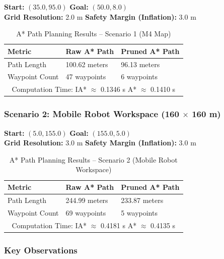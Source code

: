 \textbf{Start:} $(35.0, 95.0)$ \quad \textbf{Goal:} $(50.0, 8.0)$ \\
\textbf{Grid Resolution:} 2.0 m \quad \textbf{Safety Margin (Inflation):} 3.0 m

\begin{table}[H]
	\centering
	\caption{A* Path Planning Results -- Scenario 1 (M4 Map)}
	\label{tab:astar_results_scenario1}
	\begin{tabular}{|p{4.5cm}|p{4cm}|p{4cm}|}
		\hline
		\textbf{Metric} & \textbf{Raw A* Path} & \textbf{Pruned A* Path} \\
		\hline
		Path Length & 100.62 meters & 96.13 meters \\
		\hline
		Waypoint Count & 47 waypoints & 6 waypoints \\
		\hline
		\multicolumn{3}{|c|}{Computation Time: IA* $\approx$ 0.1346 s \quad A* $\approx$ 0.1410 s} \\
		\hline
	\end{tabular}
\end{table}

\subsubsection*{Scenario 2: Mobile Robot Workspace (160 $\times$ 160 m)}

\textbf{Start:} $(5.0, 155.0)$ \quad \textbf{Goal:} $(155.0, 5.0)$ \\
\textbf{Grid Resolution:} 3.0 m \quad \textbf{Safety Margin (Inflation):} 3.0 m

\begin{table}[H]
	\centering
	\caption{A* Path Planning Results -- Scenario 2 (Mobile Robot Workspace)}
	\label{tab:astar_results_scenario2}
	\begin{tabular}{|p{4.5cm}|p{4cm}|p{4cm}|}
		\hline
		\textbf{Metric} & \textbf{Raw A* Path} & \textbf{Pruned A* Path} \\
		\hline
		Path Length & 244.99 meters & 233.87 meters \\
		\hline
		Waypoint Count & 69 waypoints & 5 waypoints \\
		\hline
		\multicolumn{3}{|c|}{Computation Time: IA* $\approx$ 0.4181 s \quad A* $\approx$ 0.4135 s} \\
		\hline
	\end{tabular}
\end{table}

\subsubsection*{Key Observations}

